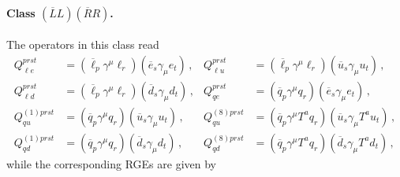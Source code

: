 \paragraph{\texorpdfstring{Class $(\overline{L}L)(\overline{R}R)$}{Class (Lbar L)(Rbar R)}.}
The operators in this class read
\begin{align}
Q_{\ell e}^{prst} &= (\overline{\ell}_p \gamma^\mu \ell_r)(\overline{e}_s \gamma_\mu e_t)\,, & Q_{\ell u}^{prst} &= (\overline{\ell}_p \gamma^\mu \ell_r)(\overline{u}_s \gamma_\mu u_t)\,, \\
Q_{\ell d}^{prst}&= (\overline{\ell}_p \gamma^\mu \ell_r)(\overline{d}_s \gamma_\mu d_t)\,, & Q_{qe}^{prst} &= (\overline{q}_p \gamma^\mu q_r)(\overline{e}_s \gamma_\mu e_t)\,,\\
Q_{qu}^{(1)prst} &= (\overline{q}_p \gamma^\mu q_r)(\overline{u}_s \gamma_\mu u_t)\,, & Q_{qu}^{(8)prst} &= (\overline{q}_p \gamma^\mu T^a q_r)(\overline{u}_s \gamma_\mu T^au_t)\,,\\
Q_{qd}^{(1)prst} &= (\overline{q}_p \gamma^\mu q_r)(\overline{d}_s \gamma_\mu d_t)\,, & Q_{qd}^{(8)prst} &= (\overline{q}_p \gamma^\mu T^a q_r)(\overline{d}_s \gamma_\mu T^a d_t)\,,
\end{align}
while the corresponding RGEs are given by
